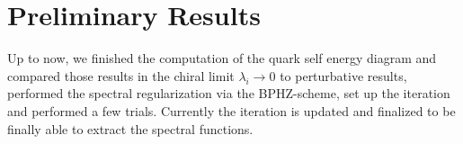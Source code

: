 \section{Preliminary Results}
Up to now, we finished the computation of the quark self energy diagram and compared those results in the chiral limit $\lambda_i\rightarrow 0$ to perturbative results, performed the spectral regularization via the BPHZ-scheme, set up the iteration and performed a few trials. Currently the iteration is updated and finalized to be finally able to extract the spectral functions. 
